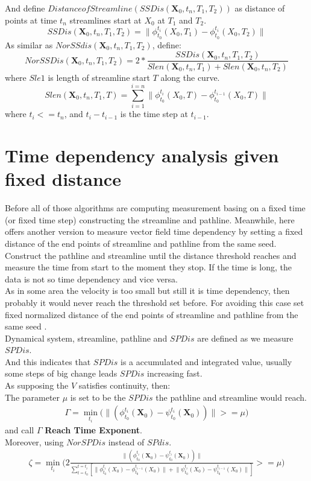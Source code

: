 \documentclass[
     11pt,         %
     a4paper,      %
     oneside,
     ]{article}
\newcommand{\vect}[1]{\boldsymbol{#1}}
\begin{document}
	And define $Distance of Streamline (SSDis(\vect{X}_{0},t_{n},T_{1},T_{2}))$ as distance of points at time $t_{n}$ streamlines start at $X_{0}$ at $ T_{1} $ and $ T_{2} $.
	$$SSDis(\vect{X}_{0},t_{n},T_{1},T_{2})=\biggr\lVert \phi_{t_{0}}^{t_{i}}(X_{0},T_{1})-\phi_{t_{0}}^{t_{i}}(X_{0},T_{2})\biggr\rVert$$
	As similar as $NorSSdis(\vect{X}_{0},t_{n},T_{1},T_{2})$, define:
	$$NorSSDis(\vect{X}_{0},t_{n},T_{1},T_{2})=2*\frac{SSDis(\vect{X}_{0},t_{n},T_{1},T_{2})}{Slen(\vect{X}_{0},t_{n},T_{1})+Slen(\vect{X}_{0},t_{n},T_{2})}$$
	where $Sle1$ is length of streamline start $T$ along the curve.
	$$Slen(\vect{X}_{0},t_{n},T_{1},T)=\sum_{i=1}^{i=n}\biggr\lVert\phi_{t_{0}}^{t_{i}}(X_{0},T)-\phi_{t_{0}}^{t_{i-1}}(X_{0},T)\biggr\rVert$$
	where $t_{i}<=t_{n}$, and $t_{i}-t_{i-1}$ is the time step at $t_{i-1}$.

\section{Time dependency analysis given fixed distance}
Before all of those algorithms are computing measurement basing on a fixed time (or fixed time step) constructing the streamline and pathline. Meanwhile, here offers another version to measure vector field time dependency by setting a fixed distance of the end points of streamline and pathline from the same seed. Construct the pathline and streamline until the distance threshold reaches and measure the time from start to the moment they stop. If the time is long, the data is not so time dependency and vice versa.\\
As in some area the velocity is too small but still it is time dependency, then probably it would never reach the threshold set before. For avoiding this case set fixed normalized distance of the end points of streamline and pathline from the same seed . \\
Dynamical system, streamline, pathline and $SPDis$ are defined as we measure $SPDis$.\\
And this indicates that $SPDis$ is a accumulated and integrated value, usually some steps of big change leads $SPDis$ increasing fast.\\
As supposing the $V$ satisfies continuity, then:\\

The parameter $\mu$ is set to be the $SPDis$ the pathline and streamline would reach.\\
\begin{eqnarray}
\Gamma=\min_{t_{i}}\biggr(\biggr\lVert(\phi_{t_{0}}^{t_{i}}(\vect{X}_{0})-\psi_{t_{0}}^{t_{i}}(\vect{X}_{0})) \biggr\rVert>=\mu\biggr)
\end{eqnarray}
and call $\Gamma$ \textbf{Reach Time Exponent}.\\
Moreover, using $NorSPDis$ instead of $SPdis$.\\
\begin{eqnarray}
\zeta=\min_{t_{i}}\biggr(2\frac{\biggr\lVert(\phi_{t_{0}}^{t_{i}}(\vect{X}_{0})-\psi_{t_{0}}^{t_{i}}(\vect{X}_{0})) \biggr\rVert}{\sum_{t=t_{0}}^{t=t_{i}}[\lVert\phi_{t_{0}}^{t_{i}}(X_{0})-\phi_{t_{0}}^{t_{i-1}}(X_{0})\rVert+\lVert\psi_{t_{0}}^{t_{i}}(X_{0})-\psi_{t_{0}}^{t_{i-1}}(X_{0})\rVert]}>=\mu\biggr)
\end{eqnarray}
\end{document}
